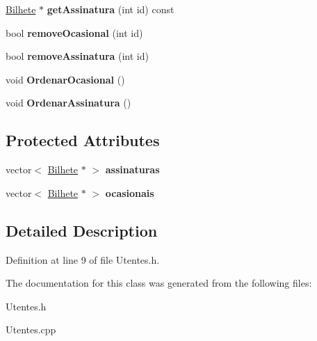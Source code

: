 \begin{DoxyCompactItemize}
\item 
\mbox{\label{classUtentes_a5ca0809a71d1f5502bee0c43dbc29249}} 
\mbox{\hyperlink{classBilhete}{Bilhete}} $\ast$ {\bfseries get\+Assinatura} (int id) const
\item 
\mbox{\label{classUtentes_adbcc5c702868c3d0059d584e6c0c76b3}} 
bool {\bfseries remove\+Ocasional} (int id)
\item 
\mbox{\label{classUtentes_a40cd1966e10c7c8b5f43388371b3bc9b}} 
bool {\bfseries remove\+Assinatura} (int id)
\item 
\mbox{\label{classUtentes_aa9f208d9c3c67271935d2cfd0d7de835}} 
void {\bfseries Ordenar\+Ocasional} ()
\item 
\mbox{\label{classUtentes_acf9a83b00d8e499c461b12b31b874289}} 
void {\bfseries Ordenar\+Assinatura} ()
\end{DoxyCompactItemize}
\subsection*{Protected Attributes}
\begin{DoxyCompactItemize}
\item 
\mbox{\label{classUtentes_a88dcb646c2269496c498461619733b89}} 
vector$<$ \mbox{\hyperlink{classBilhete}{Bilhete}} $\ast$ $>$ {\bfseries assinaturas}
\item 
\mbox{\label{classUtentes_ab701e330b7b80faae464dd9c64e32f5a}} 
vector$<$ \mbox{\hyperlink{classBilhete}{Bilhete}} $\ast$ $>$ {\bfseries ocasionais}
\end{DoxyCompactItemize}


\subsection{Detailed Description}


Definition at line 9 of file Utentes.\+h.



The documentation for this class was generated from the following files\+:\begin{DoxyCompactItemize}
\item 
Utentes.\+h\item 
Utentes.\+cpp\end{DoxyCompactItemize}
